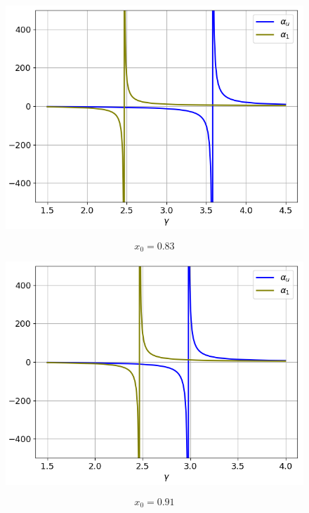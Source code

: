 \documentclass[fullscreen=true, unicode, bookmarks=false]{beamer}
\begin{document}
\begin{frame}

\begin{figure} 
\includegraphics[scale=0.65]{comparison_au_a1_1.png}  
\end{figure}

$$ x_0 = 0.83 $$

\end{frame}

\begin{frame}

\begin{figure} 
\includegraphics[scale=0.65]{comparison_au_a1_2.png}  
\end{figure}

$$ x_0 = 0.91 $$

\end{frame}
\end{document}
